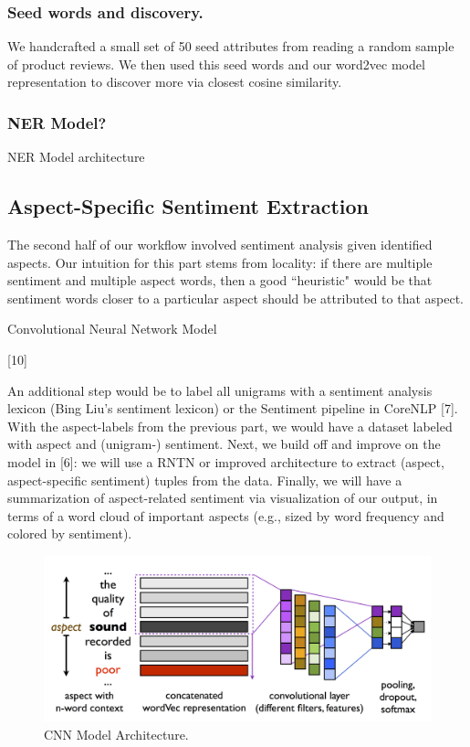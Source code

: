 \documentclass{article} %
\begin{document}
\subsubsection{Seed words and discovery.} We handcrafted a small set of 50 seed attributes from reading a random sample of product reviews. We then used this seed words and our word2vec model representation to discover more via closest cosine similarity.

\subsubsection{NER Model?}

NER Model architecture


\subsection{Aspect-Specific Sentiment Extraction}

The second half of our workflow involved sentiment analysis given identified aspects. Our intuition for this part stems from locality: if there are multiple sentiment and multiple aspect words, then a good ``heuristic" would be that sentiment words closer to a particular aspect should be attributed to that aspect.

Convolutional Neural Network Model

[10]

An additional step would be to label all unigrams with a sentiment analysis lexicon (Bing Liu's sentiment lexicon) or the Sentiment pipeline in CoreNLP [7]. With the aspect-labels from the previous part, we would have a dataset labeled with aspect and (unigram-) sentiment. Next, we build off and improve on the model in [6]: we will use a RNTN or improved architecture to extract (aspect, aspect-specific sentiment) tuples from the data. Finally, we will have a summarization of aspect-related sentiment via visualization of our output, in terms of a word cloud of important aspects (e.g., sized by word frequency and colored by sentiment). 




\begin{figure}[ht]
\begin{center}
\includegraphics[width=\columnwidth]{model_architecture.png}
\end{center}
\caption{CNN Model Architecture.}
\label{architecture}
\end{figure}
\end{document}
